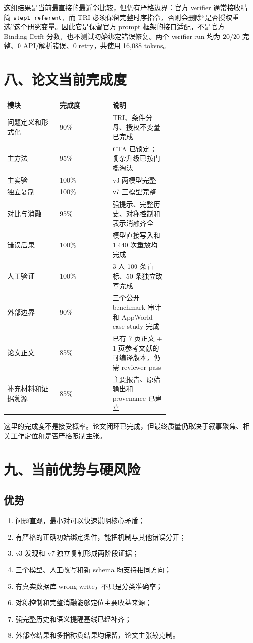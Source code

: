 \documentclass[10pt,fontset=none]{ctexart}
\begin{document}
\par 这组结果是当前最直接的最近邻比较，但仍有严格边界：官方 verifier 通常接收精简 \texttt{step1\_referent}，而 TRI 必须保留完整时序指令，否则会删除“是否授权重选”这个研究变量。因此它是保留官方 prompt 框架的接口适配，不是官方 Binding Drift 分数，也不测试初始绑定错误修复。两个 verifier run 均为 20/20 完整、0 API/解析错误、0 retry，共使用 16,088 tokens。
\section{八、论文当前完成度}
\begin{longtable}{@{}p{0.220\linewidth} p{0.220\linewidth} p{0.220\linewidth}@{}}
\toprule
模块 & 完成度 & 说明 \\
\midrule\endhead
问题定义和形式化 & 90\% & TRI、条件分母、授权不变量已完成 \\
主方法 & 95\% & CTA 已锁定；复杂升级已按门槛淘汰 \\
主实验 & 100\% & v3 两模型完整 \\
独立复制 & 100\% & v7 三模型完整 \\
对比与消融 & 95\% & 强提示、完整历史、对称控制和表示消融齐全 \\
错误后果 & 100\% & 模型直接写入和 1,440 次重放均完成 \\
人工验证 & 100\% & 3 人 100 条盲标、50 条独立改写完成 \\
外部边界 & 90\% & 三个公开 benchmark 审计和 AppWorld case study 完成 \\
论文正文 & 85\% & 已有 7 页正文 + 1 页参考文献的可编译版本，仍需 reviewer pass \\
补充材料和证据溯源 & 85\% & 主要报告、原始输出和 provenance 已建立 \\
\bottomrule
\end{longtable}

\par 这里的完成度不是接受概率。论文闭环已完成，但最终质量仍取决于叙事聚焦、相关工作定位和是否严格限制主张。
\section{九、当前优势与硬风险}
\subsection{优势}
\begin{enumerate}
\item 问题直观，最小对可以快速说明核心矛盾；
\item 有严格的正确初始绑定条件，能把机制与其他错误分开；
\item v3 发现和 v7 独立复制形成两阶段证据；
\item 三个模型、人工改写和新 schema 均支持相同方向；
\item 有真实数据库 wrong write，不只是分类准确率；
\item 对称控制和完整消融能够定位主要收益来源；
\item 强完整历史和语义提醒基线已经补齐；
\item 外部零结果和多指称负结果均保留，论文主张较克制。
\end{enumerate}
\end{document}
